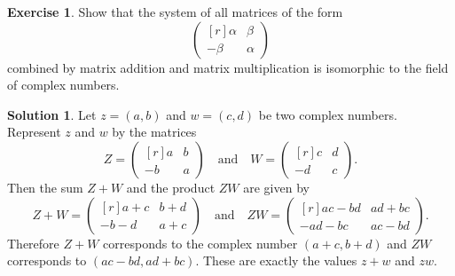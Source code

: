 \documentclass{article}
\theoremstyle{definition}
\newtheorem{exercise}{Exercise}
\newtheorem*{solution}{Solution}
\begin{document}
\begin{exercise}
    Show that the system of all matrices of the form
    \[\begin{pmatrix*}[r]
        \alpha & \beta \\
        -\beta & \alpha
    \end{pmatrix*}\]
    combined by matrix addition and matrix multiplication is isomorphic to the field of complex numbers.
\end{exercise}
\begin{solution}
    Let \(z=(a,b)\) and \(w=(c,d)\) be two complex numbers. Represent \(z\) and \(w\) by the matrices
    \[Z=
    \begin{pmatrix*}[r]
        a & b \\
        -b & a
    \end{pmatrix*}
    \quad\text{and}\quad
    W=
    \begin{pmatrix*}[r]
        c & d \\
        -d & c
    \end{pmatrix*}.\]
    Then the sum \(Z+W\) and the product \(ZW\) are given by
    \[Z+W=
    \begin{pmatrix*}[r]
        a+c & b+d \\
        -b-d & a+c
    \end{pmatrix*}
    \quad\text{and}\quad
    ZW=
    \begin{pmatrix*}[r]
        ac-bd & ad+bc \\
        -ad-bc & ac-bd
    \end{pmatrix*}.\]
    Therefore \(Z+W\) corresponds to the complex number \((a+c, b+d)\) and \(ZW\) corresponds to \((ac-bd, ad+bc)\). These are exactly the values \(z+w\) and \(zw\).
\end{solution}
\end{document}

